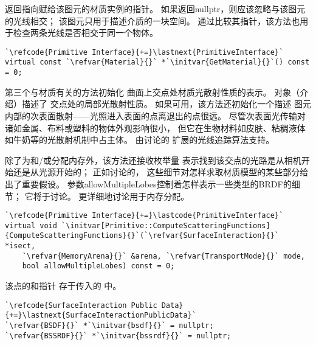 返回指向赋给该图元的材质实例的指针。
如果返回{\ttfamily nullptr}，则应该忽略与该图元的光线相交；
该图元只用于描述介质的一块空间。
通过比较其指针，该方法也用于检查两条光线是否相交于同一个物体。
\begin{lstlisting}
`\refcode{Primitive Interface}{+=}\lastnext{PrimitiveInterface}`
virtual const `\refvar{Material}{}` *`\initvar{GetMaterial}{}`() const = 0;
\end{lstlisting}

第三个与材质有关的方法初始化
曲面上交点处材质光散射性质的表示。
对象（介绍）描述了
交点处的局部光散射性质。
如果可用，该方法还初始化一个描述
图元内部的次表面散射——光照进入表面的点离退出的点很远。
尽管次表面光传输对诸如金属、布料或塑料的物体外观影响很小，
但它在生物材料如皮肤、粘稠液体如牛奶等的光散射机制中占主体。
由讨论的
扩展的光线追踪算法支持。

除了为和/或分配内存外，该方法还接收枚举量\linebreak
{}表示找到该交点的光路是从相机开始还是从光源开始的；
正如讨论的，
这些细节对怎样求取材质模型的某些部分给出了重要假设。
参数{\ttfamily allowMultipleLobes}控制着怎样表示一些类型的BRDF的细节；
它将于讨论。
更详细地讨论用于内存分配。
\begin{lstlisting}
`\refcode{Primitive Interface}{+=}\lastcode{PrimitiveInterface}`
virtual void `\initvar[Primitive::ComputeScatteringFunctions]{ComputeScatteringFunctions}{}`(`\refvar{SurfaceInteraction}{}` *isect,
    `\refvar{MemoryArena}{}` &arena, `\refvar{TransportMode}{}` mode,
    bool allowMultipleLobes) const = 0;
\end{lstlisting}

该点的和指针
存于传入的\linebreak
{}中。
\begin{lstlisting}
`\refcode{SurfaceInteraction Public Data}{+=}\lastnext{SurfaceInteractionPublicData}`
`\refvar{BSDF}{}` *`\initvar{bsdf}{}` = nullptr;
`\refvar{BSSRDF}{}` *`\initvar{bssrdf}{}` = nullptr;
\end{lstlisting}

